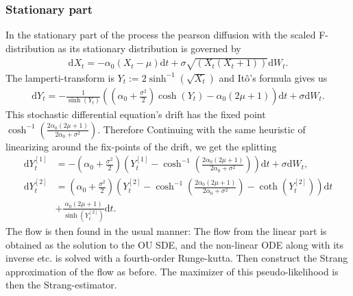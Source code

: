 \subsubsection{Stationary part}
In the stationary part of the process the pearson diffusion with the scaled F-distribution as its stationary distribution is governed by
\begin{align}
    \mathrm{d}X_t = -\alpha_0\left(X_t - \mu\right)\mathrm{d}t + \sigma \sqrt{\left(X_t\left(X_t + 1\right)\right)}\mathrm{d}W_t.
\end{align}
The lamperti-transform is $Y_t := 2 \sinh^{-1}\left(\sqrt{X_t}\right)$ and Itô's formula gives us
\begin{align}
    \mathrm{d}Y_t = - \frac{1}{\sinh(Y_t)}\left(\left(\alpha_0 + \frac{\sigma^2}{2}\right)\cosh(Y_t) - \alpha_0\left(2\mu + 1\right)\right) \mathrm{d}t + \sigma \mathrm{d}W_t.
\end{align}
This stochastic differential equation's drift has the fixed point $\cosh^{-1}\left(\frac{2\alpha_0\left(2\mu + 1\right)}{2\alpha_0 + \sigma^2}\right)$.
Therefore Continuing with the same heuristic of linearizing around the fix-points of the drift, we get the splitting
\begin{align}
    \mathrm{d}Y_t^{[1]} &= -\left(\alpha_0 + \frac{\sigma^2}{2}\right)\left(Y_t^{[1]} - \cosh^{-1}\left(\frac{2\alpha_0\left(2\mu + 1\right)}{2\alpha_0 + \sigma^2}\right)\right)\mathrm{d}t + \sigma \mathrm{d}W_t, \\
    \mathrm{d}Y_t^{[2]} &= \left(\alpha_0 + \frac{\sigma^2}{2}\right) \left(Y_t^{[2]} - \cosh^{-1}\left(\frac{2\alpha_0\left(2\mu + 1\right)}{2\alpha_0 + \sigma^2}\right) - \coth\left(Y_t^{[2]}\right) \right)\mathrm{d}t\nonumber\\
    &+ \frac{\alpha_0\left(2\mu + 1\right)}{\sinh(Y_t^{[2]})}\mathrm{d}t.
\end{align}
The flow is then found in the usual manner: The flow from the linear part is obtained as the solution to the OU SDE, and the non-linear ODE along with its inverse etc. is solved with a fourth-order Runge-kutta. Then construct the Strang approximation of the flow as before. The maximizer of this pseudo-likelihood is then the Strang-estimator.  

